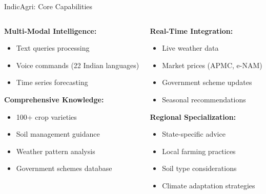 \documentclass[aspectratio=169]{beamer}
\begin{document}
\begin{frame}{IndicAgri: Core Capabilities}
\begin{columns}
\begin{column}{0.5\textwidth}
\textbf{Multi-Modal Intelligence:}
\begin{itemize}
\item Text queries processing
\item Voice commands (22 Indian languages)
\item Time series forecasting
\end{itemize}

\textbf{Comprehensive Knowledge:}
\begin{itemize}
\item 100+ crop varieties
\item Soil management guidance
\item Weather pattern analysis
\item Government schemes database
\end{itemize}
\end{column}
\begin{column}{0.5\textwidth}
\textbf{Real-Time Integration:}
\begin{itemize}
\item Live weather data
\item Market prices (APMC, e-NAM)
\item Government scheme updates
\item Seasonal recommendations
\end{itemize}

\textbf{Regional Specialization:}
\begin{itemize}
\item State-specific advice
\item Local farming practices
\item Soil type considerations
\item Climate adaptation strategies
\end{itemize}
\end{column}
\end{columns}
\end{frame}
\end{document}
